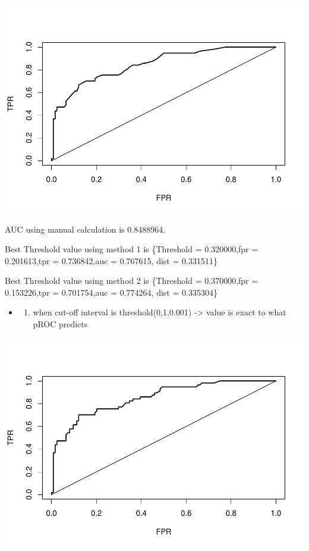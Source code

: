 \documentclass[]{article}
\providecommand{\tightlist}{%
  \setlength{\itemsep}{0pt}\setlength{\parskip}{0pt}}
\begin{document}
\includegraphics{Homework_2_files/figure-latex/unnamed-chunk-18-1.pdf}

AUC using manual calculation is 0.8488964.

Best Threshold value using method 1 is \{Threshold = 0.320000,fpr =
0.201613,tpr = 0.736842,auc = 0.767615, dist = 0.331511\}

Best Threshold value using method 2 is \{Threshold = 0.370000,fpr =
0.153226,tpr = 0.701754,auc = 0.774264, dist = 0.335304\}

\begin{itemize}
\item
  \begin{enumerate}
  \def\labelenumi{\arabic{enumi})}
  \setcounter{enumi}{1}
  \tightlist
  \item
    when cut-off interval is threshold(0,1,0.001) -\textgreater{} value
    is exact to what pROC predicts
  \end{enumerate}
\end{itemize}

\includegraphics{Homework_2_files/figure-latex/unnamed-chunk-19-1.pdf}
\end{document}
